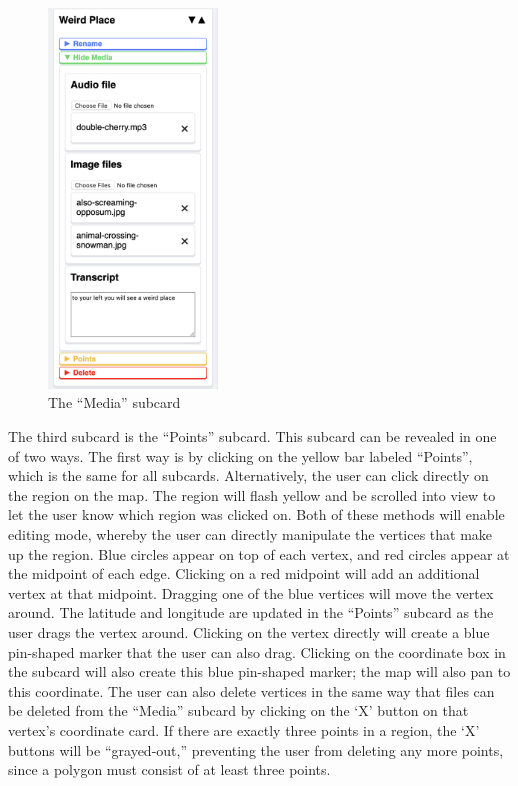 \documentclass[a4paper, 10pt, american, titlepage]{article}
\begin{document}
\begin{figure}[h]
	\centering
	\includegraphics[width=0.4\textwidth]{media-subcard-editour.png}
	\caption{The ``Media'' subcard}
	\label{fig:mediaSubcard}
\end{figure}

The third subcard is the ``Points'' subcard. This subcard can be revealed in
one of two ways. The first way is by clicking on the yellow bar labeled
``Points'', which is the same for all subcards. Alternatively, the user can
click directly on the region on the map. The region will flash yellow and be
scrolled into view to let the user know which region was clicked on. Both of
these methods will enable editing mode, whereby the user can directly
manipulate the vertices that make up the region. Blue circles appear on top of
each vertex, and red circles appear at the midpoint of each edge. Clicking on a
red midpoint will add an additional vertex at that midpoint. Dragging one of
the blue vertices will move the vertex around. The latitude and longitude are
updated in the ``Points'' subcard as the user drags the vertex around. Clicking
on the vertex directly will create a blue pin-shaped marker that the user can
also drag. Clicking on the coordinate box in the subcard will also create this
blue pin-shaped marker; the map will also pan to this coordinate. The user can
also delete vertices in the same way that files can be deleted from the
``Media'' subcard by clicking on the `X' button on that vertex's coordinate
card. If there are exactly three points in a region, the `X' buttons will be
``grayed-out,'' preventing the user from deleting any more points, since a
polygon must consist of at least three points.
\end{document}

